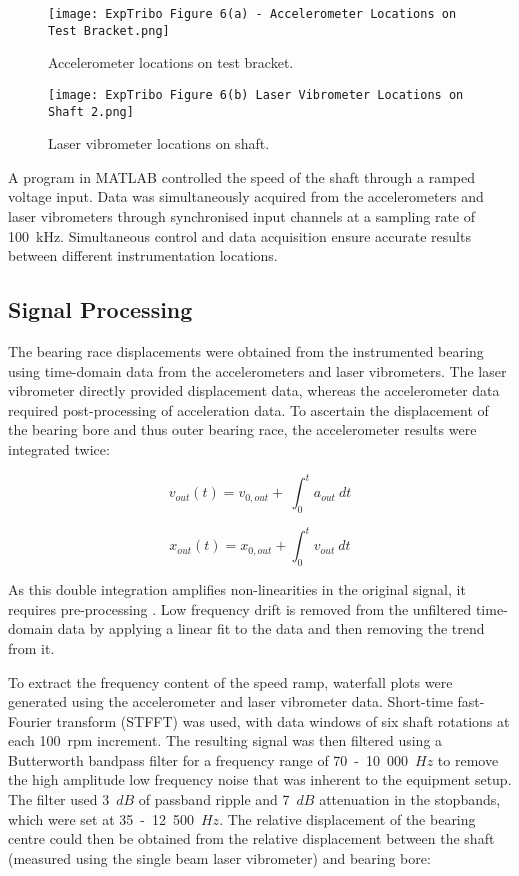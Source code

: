 \begin{figure}
	\centering
	\texttt{[image: ExpTribo Figure 6(a) - Accelerometer Locations on Test Bracket.png]}
	\caption{Accelerometer locations on test bracket.}
	\label{Accelerometer locations on test bracket}
\end{figure}

\begin{figure}
	\centering
	\texttt{[image: ExpTribo Figure 6(b) Laser Vibrometer Locations on Shaft 2.png]}
	\caption{Laser vibrometer locations on shaft.}
	\label{Laser vibrometer locations on shaft}
\end{figure}

A program in MATLAB controlled the speed of the shaft through a ramped voltage input. Data was simultaneously acquired from the accelerometers and laser vibrometers through synchronised input channels at a sampling rate of 100~kHz. Simultaneous control and data acquisition ensure accurate results between different instrumentation locations.

\subsection{Signal Processing}
The bearing race displacements were obtained from the instrumented bearing using time-domain data from the accelerometers and laser vibrometers. The laser vibrometer directly provided displacement data, whereas the accelerometer data required post-processing of acceleration data. To ascertain the displacement of the bearing bore and thus outer bearing race, the accelerometer results were integrated twice:

\begin{equation}\label{accelvelointeg}
	v_{out}\left(t\right)=v_{0,out}+\ \int_{0}^{t}{a_{out}\ dt}
\end{equation}

\begin{equation}\label{acceldispinteg}
	x_{out}\left(t\right)=x_{0,out}+\int_{0}^{t}{v_{out}\ dt}
\end{equation}

As this double integration amplifies non-linearities in the original signal, it requires pre-processing \cite{Takeda2014}. Low frequency drift is removed from the unfiltered time-domain data by applying a linear fit to the data and then removing the trend from it.  

To extract the frequency content of the speed ramp, waterfall plots were generated using the accelerometer and laser vibrometer data. Short-time fast-Fourier transform (STFFT) was used, with data windows of six shaft rotations at each 100~rpm increment. The resulting signal was then filtered using a Butterworth bandpass filter for a frequency range of 70~-~10~000~$Hz$ to remove the high amplitude low frequency noise that was inherent to the equipment setup. The filter used 3~$dB$ of passband ripple and 7~$dB$ attenuation in the stopbands, which were set at 35~-~12~500~$Hz$.  
The relative displacement of the bearing centre could then be obtained from the relative displacement between the shaft (measured using the single beam laser vibrometer) and bearing bore:

